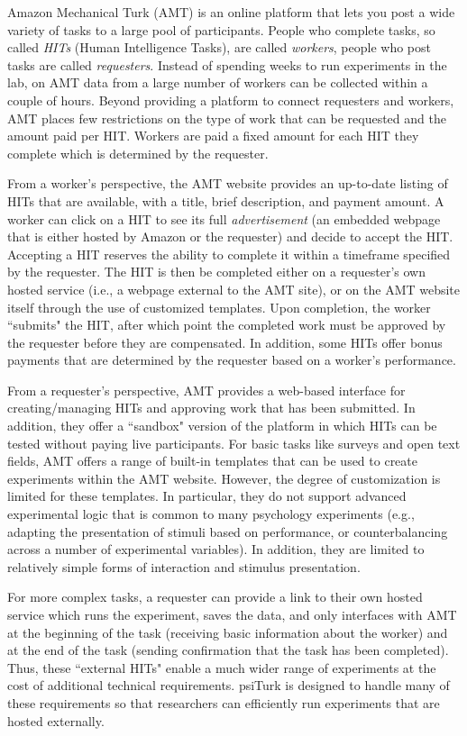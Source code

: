 \documentclass[twocolumn]{svjour3}          %
\begin{document}
Amazon Mechanical Turk (AMT) is an online platform that lets you post a wide variety of tasks to a large pool of participants. People
who complete tasks, so called \emph{HITs} (Human Intelligence Tasks), are called \emph{workers}, people who post tasks are called
\emph{requesters}.
Instead of spending weeks to run experiments in the lab, on AMT data from a large number of workers can be collected within a couple of hours.
Beyond providing a platform to connect requesters and workers, AMT places few restrictions on the type of work that can be requested and the amount paid per HIT.
Workers are paid a fixed amount for each HIT they complete which is determined by the requester.

From a worker's perspective, the AMT website provides an up-to-date listing of HITs that are available, with a title, brief description, and payment amount.
A worker can click on a HIT to see its full \emph{advertisement} (an embedded webpage that is either hosted by
Amazon or the requester) and decide to accept the HIT. 
Accepting a HIT reserves the ability to complete it within a timeframe specified by the requester.
The HIT is then be completed either on a requester's own hosted service (i.e., a webpage external to the AMT site), or on the AMT website itself through the use of customized templates.
Upon completion, the worker ``submits" the HIT, after which point the completed work must be approved by the requester before they are compensated.
In addition, some HITs offer bonus payments that are determined by the requester based on a worker's performance.

From a requester's perspective, AMT provides a web-based interface for creating/managing HITs and approving work that has been submitted.
In addition, they offer a ``sandbox" version of the platform in which HITs can be tested without paying live participants.
For basic tasks like surveys and open text fields, AMT offers a range of built-in templates that can be used to create experiments within the AMT website.
However, the degree of customization is limited for these templates. 
In particular, they do not support advanced experimental logic that is common to many psychology experiments (e.g., adapting the presentation of stimuli based on performance, or counterbalancing across a number of experimental variables).
In addition, they are limited to relatively simple forms of interaction and stimulus presentation.

For more complex tasks, a requester can provide a link to their own hosted service which runs the experiment, saves the data, and only interfaces with AMT at the beginning of the task (receiving basic information about the worker) and at the end of the task (sending confirmation that the task has been completed).
Thus, these ``external HITs" enable a much wider range of experiments at the cost of additional technical requirements.
psiTurk is designed to handle many of these requirements so that researchers can efficiently run experiments that are hosted externally.
\end{document}
